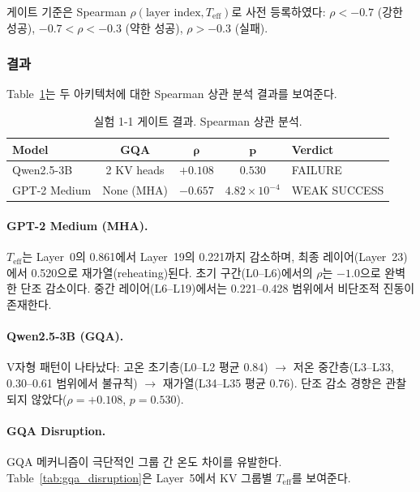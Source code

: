 \documentclass[11pt,a4paper]{article}
\begin{document}
게이트 기준은 Spearman $\rho(\text{layer index}, T_\mathrm{eff})$로 사전 등록하였다: $\rho < -0.7$ (강한 성공), $-0.7 < \rho < -0.3$ (약한 성공), $\rho > -0.3$ (실패).

\subsubsection{결과}

Table~\ref{tab:gate}는 두 아키텍처에 대한 Spearman 상관 분석 결과를 보여준다.

\begin{table}[H]
\centering
\caption{실험 1-1 게이트 결과. Spearman 상관 분석.}
\label{tab:gate}
\begin{tabular}{lcccl}
\toprule
\textbf{Model} & \textbf{GQA} & $\boldsymbol{\rho}$ & $\boldsymbol{p}$ & \textbf{Verdict} \\
\midrule
Qwen2.5-3B & 2 KV heads & $+0.108$ & $0.530$ & \textcolor{failure}{FAILURE} \\
GPT-2 Medium & None (MHA) & $-0.657$ & $4.82 \times 10^{-4}$ & \textcolor{partial}{WEAK SUCCESS} \\
\bottomrule
\end{tabular}
\end{table}

\paragraph{GPT-2 Medium (MHA).}
$T_\mathrm{eff}$는 Layer~0의 0.861에서 Layer~19의 0.221까지 감소하며, 최종 레이어(Layer~23)에서 0.520으로 재가열(reheating)된다.
초기 구간(L0--L6)에서의 $\rho$는 $-1.0$으로 완벽한 단조 감소이다.
중간 레이어(L6--L19)에서는 0.221--0.428 범위에서 비단조적 진동이 존재한다.

\paragraph{Qwen2.5-3B (GQA).}
V자형 패턴이 나타났다: 고온 초기층(L0--L2 평균 0.84) $\to$ 저온 중간층(L3--L33, 0.30--0.61 범위에서 불규칙) $\to$ 재가열(L34--L35 평균 0.76).
단조 감소 경향은 관찰되지 않았다($\rho = +0.108$, $p = 0.530$).

\paragraph{GQA Disruption.}
GQA 메커니즘이 극단적인 그룹 간 온도 차이를 유발한다.
Table~\ref{tab:gqa_disruption}은 Layer~5에서 KV 그룹별 $T_\mathrm{eff}$를 보여준다.
\end{document}
